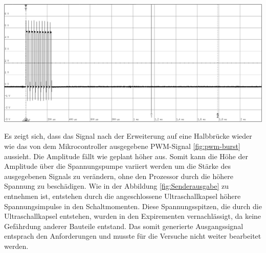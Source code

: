 \begin{minipage}{0.5\textwidth}
\includegraphics[width=1\textwidth%
]{Abbildungen/MessungenP1/PWM-Nach-der-Halbbrucke-mit-LS.png}
\label{fig:Senderausgabe}
\end{minipage}
Es zeigt sich, dass das Signal nach der Erweiterung auf eine Halbbrücke wieder wie das von dem Mikrocontroller ausgegebene PWM-Signal \ref{fig:pwm-burst} aussieht. Die Amplitude fällt wie geplant höher aus. Somit kann die Höhe der Amplitude über die Spannungspumpe variiert werden um die Stärke des ausgegebenen Signals zu verändern, ohne den Prozessor durch die höhere Spannung zu beschädigen. Wie in der Abbildung \ref{fig:Senderausgabe} zu entnehmen ist, entstehen durch die angeschlossene Ultraschallkapsel höhere Spannungsimpulse in den Schaltmomenten. Diese Spannungsspitzen, die durch die Ultraschallkapsel entstehen, wurden in den Expirementen vernachlässigt, da keine Gefährdung anderer Bauteile entstand. Das somit generierte Ausgangssignal entsprach den Anforderungen und musste für die Versuche nicht weiter bearbeitet werden.
